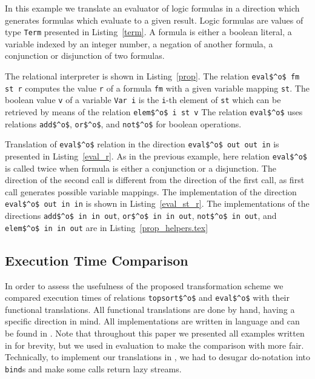In this example we translate an evaluator of logic formulas in a direction which generates formulas which evaluate to a given result.
Logic formulas are values of type \lstinline{Term} presented in Listing~\ref{term}.
A formula is either a boolean literal, a variable indexed by an integer number, a negation of another formula, a conjunction or disjunction of two formulas.

The relational interpreter is shown in Listing~\ref{prop}.
The relation \lstinline{eval$^o$ fm st r} computes the value \lstinline{r} of a formula \lstinline{fm} with a given variable mapping \lstinline{st}.
The boolean value \lstinline{v} of a variable \lstinline{Var i} is the \lstinline{i}-th element of \lstinline{st} which can be retrieved by means of the relation \lstinline{elem$^o$ i st v}
The relation \lstinline{eval$^o$} uses relations \lstinline{add$^o$}, \lstinline{or$^o$}, and \lstinline{not$^o$} for boolean operations.

Translation of \lstinline{eval$^o$} relation in the direction \lstinline[breaklines=true]{eval$^o$ out out in} is presented in Listing~\ref{eval_r}.
As in the previous example, here relation \lstinline{eval$^o$} is called twice when formula is either a conjunction or a disjunction.
The direction of the second call is different from the direction of the first call, as first call generates possible variable mappings.
The implementation of the direction \lstinline{eval$^o$ out in in} is shown in Listing~\ref{eval_st_r}.
The implementations of the directions \lstinline{add$^o$ in in out}, \lstinline{or$^o$ in in out}, \lstinline{not$^o$ in out}, and \lstinline{elem$^o$ in in out} are in Listing~\ref{prop_helpers.tex}







\subsection{Execution Time Comparison}

In order to assess the usefulness of the proposed transformation scheme we compared execution times of \mk relations \lstinline{topsort$^o$} and \lstinline{eval$^o$} with their functional translations.
All functional translations are done by hand, having a specific direction in mind.
All implementations are written in \ocaml language and can be found in .
Note that throughout this paper we presented all examples written in \haskell for brevity, but we used \ocaml in evaluation to make the comparison with \ocanren more fair.
Technically, to implement our translations in \ocaml, we had to desugar \haskell do-notation into \lstinline{bind}s and make some calls return lazy streams.


